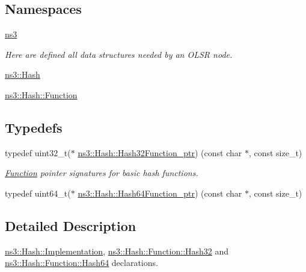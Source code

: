 \subsection*{Namespaces}
\begin{DoxyCompactItemize}
\item 
 \hyperlink{namespacens3}{ns3}
\begin{DoxyCompactList}\small\item\em Here are defined all data structures needed by an O\+L\+SR node. \end{DoxyCompactList}\item 
 \hyperlink{namespacens3_1_1Hash}{ns3\+::\+Hash}
\item 
 \hyperlink{namespacens3_1_1Hash_1_1Function}{ns3\+::\+Hash\+::\+Function}
\end{DoxyCompactItemize}
\subsection*{Typedefs}
{\bf }\par
\begin{DoxyCompactItemize}
\item 
typedef uint32\+\_\+t($\ast$ \hyperlink{group__hash_gaf05ee221eddbade063bfefbf34ed485a}{ns3\+::\+Hash\+::\+Hash32\+Function\+\_\+ptr}) (const char $\ast$, const size\+\_\+t)
\begin{DoxyCompactList}\small\item\em \hyperlink{namespacens3_1_1Hash_1_1Function}{Function} pointer signatures for basic hash functions. \end{DoxyCompactList}\item 
typedef uint64\+\_\+t($\ast$ \hyperlink{group__hash_gab363931a84d780a98d09dd85db36a666}{ns3\+::\+Hash\+::\+Hash64\+Function\+\_\+ptr}) (const char $\ast$, const size\+\_\+t)
\end{DoxyCompactItemize}



\subsection{Detailed Description}
\hyperlink{classns3_1_1Hash_1_1Implementation}{ns3\+::\+Hash\+::\+Implementation}, \hyperlink{classns3_1_1Hash_1_1Function_1_1Hash32}{ns3\+::\+Hash\+::\+Function\+::\+Hash32} and \hyperlink{classns3_1_1Hash_1_1Function_1_1Hash64}{ns3\+::\+Hash\+::\+Function\+::\+Hash64} declarations. 


